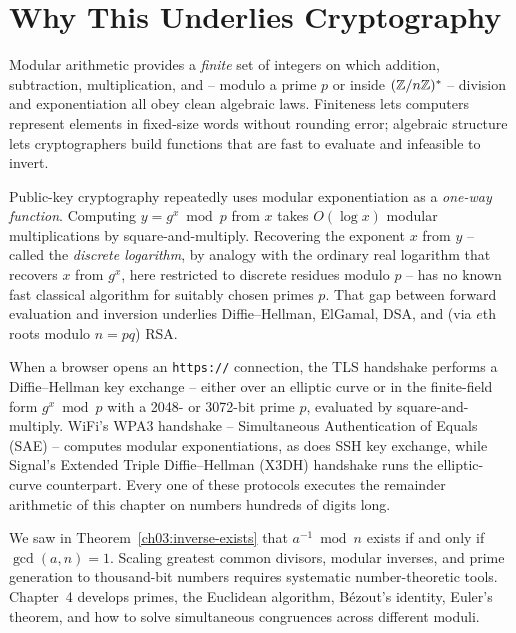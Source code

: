 \section{Why This Underlies Cryptography}

Modular arithmetic provides a \emph{finite} set of integers on which addition, subtraction, multiplication, and -- modulo a prime $p$ or inside $(\mathbb{Z}/n\mathbb{Z})^{*}$ -- division and exponentiation all obey clean algebraic laws. Finiteness lets computers represent elements in fixed-size words without rounding error; algebraic structure lets cryptographers build functions that are fast to evaluate and infeasible to invert.

\begin{aestheticbox}
Public-key cryptography repeatedly uses modular exponentiation as a \emph{one-way function}. Computing $y = g^x \bmod p$ from $x$ takes $O(\log x)$ modular multiplications by square-and-multiply. Recovering the exponent $x$ from $y$ -- called the \emph{discrete logarithm}, by analogy with the ordinary real logarithm that recovers $x$ from $g^x$, here restricted to discrete residues modulo $p$ -- has no known fast classical algorithm for suitably chosen primes $p$. That gap between forward evaluation and inversion underlies Diffie--Hellman, ElGamal, DSA, and (via $e$th roots modulo $n = pq$) RSA.
\end{aestheticbox}

\begin{applicationbox}
When a browser opens an \texttt{https://} connection, the TLS handshake performs a Diffie--Hellman key exchange -- either over an elliptic curve or in the finite-field form $g^x \bmod p$ with a 2048- or 3072-bit prime $p$, evaluated by square-and-multiply. WiFi's WPA3 handshake -- Simultaneous Authentication of Equals (SAE) -- computes modular exponentiations, as does SSH key exchange, while Signal's Extended Triple Diffie--Hellman (X3DH) handshake runs the elliptic-curve counterpart. Every one of these protocols executes the remainder arithmetic of this chapter on numbers hundreds of digits long.
\end{applicationbox}

We saw in Theorem~\ref{ch03:inverse-exists} that $a^{-1} \bmod n$ exists if and only if $\gcd(a, n) = 1$. Scaling greatest common divisors, modular inverses, and prime generation to thousand-bit numbers requires systematic number-theoretic tools. Chapter~4 develops primes, the Euclidean algorithm, B\'ezout's identity, Euler's theorem, and how to solve simultaneous congruences across different moduli.

